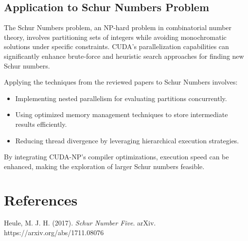 \documentclass[12pt]{article}
\begin{document}
\subsection{Application to Schur Numbers Problem}

The Schur Numbers problem, an NP-hard problem in combinatorial number theory, involves partitioning sets of integers while avoiding monochromatic solutions under specific constraints. CUDA's parallelization capabilities can significantly enhance brute-force and heuristic search approaches for finding new Schur numbers.

Applying the techniques from the reviewed papers to Schur Numbers involves:
\begin{itemize}
    \item Implementing nested parallelism for evaluating partitions concurrently.
    \item Using optimized memory management techniques to store intermediate results efficiently.
    \item Reducing thread divergence by leveraging hierarchical execution strategies.
\end{itemize}

By integrating CUDA-NP's compiler optimizations, execution speed can be enhanced, making the exploration of larger Schur numbers feasible.


\section*{References}
Heule, M. J. H. (2017). \textit{Schur Number Five}. arXiv. https://arxiv.org/abs/1711.08076
\end{document}
